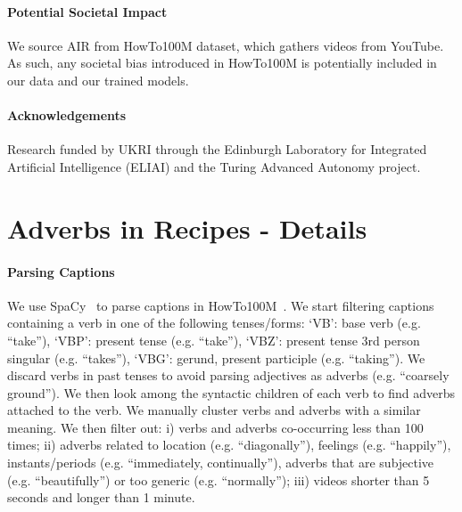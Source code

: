 \documentclass[10pt,twocolumn,letterpaper]{article}
\newcommand{\fparagraph}[1]{\paragraph{#1}}
\begin{document}
\vspace{-12pt}
\fparagraph{Potential Societal Impact} We source AIR from HowTo100M dataset, which gathers videos from YouTube. As such, any societal bias introduced in HowTo100M is potentially included in our data and our trained models.

\vspace{-7pt}

\fparagraph{Acknowledgements} Research funded by UKRI through the Edinburgh Laboratory for Integrated Artificial Intelligence (ELIAI) and the Turing Advanced Autonomy project.


{\small


}

\pagebreak

\appendix

\section{Adverbs in Recipes - Details}
\label{sec:air_details}

\paragraph{Parsing Captions}
We use SpaCy~\cite{ines_montani_2022_7310816} to parse captions in HowTo100M~\cite{miech19howto100m}. We start filtering captions containing a verb in one of the following tenses/forms: `VB': base verb (e.g. ``take''), `VBP': present tense (e.g. ``take''), `VBZ': present tense 3rd person singular (e.g. ``takes''), `VBG': gerund, present participle (e.g. ``taking''). 
We 
discard verbs in past tenses to avoid parsing adjectives as adverbs (e.g. ``coarsely ground''). 
We then look among the syntactic children of each verb to find adverbs attached to the verb. We manually cluster verbs and adverbs with a similar meaning. We then filter out: i) verbs and adverbs co-occurring less than 100 times; ii) adverbs related to location (e.g. ``diagonally''), feelings (e.g. ``happily''), instants/periods (e.g. ``immediately, continually''), adverbs that are subjective (e.g. ``beautifully'') or too generic (e.g. ``normally''); iii) videos shorter than 5 seconds and longer than 1 minute. 

\vspace{-10pt}
\end{document}
